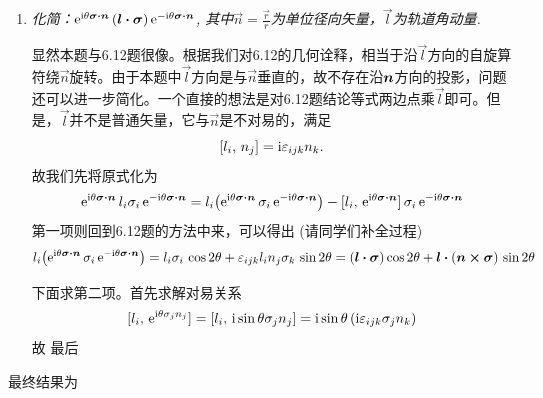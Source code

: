 \begin{enumerate}[label=\textbf{6.\Alph*}, listparindent=\parindent, leftmargin=-0.5mm]
\begin{enumerate}[listparindent=\parindent]
\item \emph{化简：$\mathrm{e}^{\mathrm{i}\theta\boldsymbol{\sigma\cdot n}}\,(\boldsymbol{l\cdot \sigma})\,\mathrm{e}^{-\mathrm{i}\theta\boldsymbol{\sigma\cdot n}}$, 其中$\vec{n}=\frac{\vec{r}}{r}$为单位径向矢量，$\vec{l}$为轨道角动量.}

显然本题与6.12题很像。根据我们对6.12的几何诠释，相当于沿$\vec{l}$方向的自旋算符绕$\vec{n}$旋转。由于本题中$\vec{l}$方向是与$\vec{n}$垂直的，故不存在沿$\boldsymbol{n}$方向的投影，问题还可以进一步简化。一个直接的想法是对6.12题结论等式两边点乘$\vec{l}$即可。但是，$\vec{l}$并不是普通矢量，它与$\vec{n}$是不对易的，满足
\[[l_i,\,n_j]=\mathrm{i}\varepsilon_{ijk}n_k.\]
故我们先将原式化为
\[\mathrm{e}^{\mathrm{i}\theta\boldsymbol{\sigma\cdot n}}\,l_i\sigma_i\,\mathrm{e}^{-\mathrm{i}\theta\boldsymbol{\sigma\cdot n}} = l_i\qty(\mathrm{e}^{\mathrm{i}\theta\boldsymbol{\sigma\cdot n}}\,\sigma_i\,\mathrm{e}^{-\mathrm{i}\theta\boldsymbol{\sigma\cdot n}})-[l_i,\,\mathrm{e}^{\mathrm{i}\theta\boldsymbol{\sigma\cdot n}}]\,\sigma_i\,\mathrm{e}^{-\mathrm{i}\theta\boldsymbol{\sigma\cdot n}}\]
第一项则回到6.12题的方法中来，可以得出 (请同学们补全过程)
\[l_i\qty(\mathrm{e}^{\mathrm{i}\theta\boldsymbol{\sigma\cdot n}}\,\sigma_i\,\mathrm{e}^{-\mathrm{i}\theta\boldsymbol{\sigma\cdot n}}) = l_i\sigma_i\,\cos2\theta +\varepsilon_{ijk} l_in_j\sigma_k\,\sin2\theta=(\boldsymbol{l\cdot \sigma})\cos2\theta+\boldsymbol{l}\boldsymbol{\cdot}(\boldsymbol{n\times\sigma})\,\sin2\theta\]

下面求第二项。首先求解对易关系
\[[l_i,\,\mathrm{e}^{\mathrm{i}\theta\sigma_jn_j}]=[l_i,\,\mathrm{i}\sin\theta\sigma_jn_j]=\mathrm{i}\sin\theta\,(\mathrm{i}\varepsilon_{ijk} \sigma_j n_k)\]
故
最后
\end{enumerate}
最终结果为



\end{enumerate}
